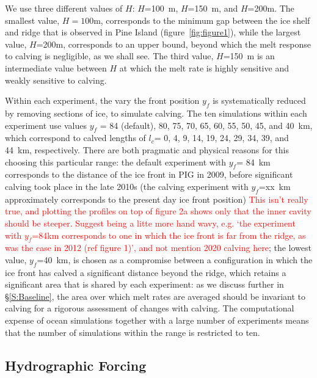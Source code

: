 \documentclass[draft]{agujournal2019}
\newcommand{\red}[1]{\textcolor{red}{#1}}
\begin{document}
We use three different values of $H$: $H$=100~m, $H$=150~m, and $H$=200m. The smallest value, $H = 100$m, corresponds to the minimum gap between the ice shelf and ridge that is observed in Pine Island (figure~\ref{fig:figure1}), while the largest value, $H$=200m, corresponds to an upper bound, beyond which the melt response to calving is negligible, as we shall see. The third value, $H$=150~m is an intermediate value between $H$ at which the melt rate is highly sensitive and weakly sensitive to calving.

Within each experiment, the vary the front position $y_f$ is systematically reduced by removing sections of ice, to simulate calving. The ten simulations within each experiment use values $y_f$ = 84 (default), 80, 75, 70, 65, 60, 55, 50, 45, and 40~km, which correspond to calved lengths of $l_c$= 0, 4, 9, 14, 19, 24, 29, 34, 39, and 44~km, respectively. There are both pragmatic and physical reasons for this choosing this particular range: the default experiment with $y_f$= 84~km corresponds to the distance of the ice front in PIG in 2009, before significant calving took place in the late 2010s (the calving experiment with $y_f$=xx~km approximately corresponds to the present day ice front position) \red{This isn't really true, and plotting the profiles on top of figure 2a shows only that the inner cavity should be steeper. Suggest being a litte more hand wavy, e.g. `the experiment with $y_f$=84km corresponds to one in which the ice front is far from the ridge, as was the case in 2012 (ref figure 1)', and not mention 2020 calving here}; the lowest value, $y_f$=40~km, is chosen as a compromise between a configuration in which the ice front has calved a significant distance beyond the ridge, which retains a significant area that is shared by each experiment: as we discuss further in \S\ref{S:Baseline}, the area over which melt rates are averaged should be invariant to calving for a rigorous assessment of changes with calving. The computational expense of ocean simulations together with a large number of experiments means that the number of simulations within the range is restricted to ten.

\subsection{Hydrographic Forcing}\label{S:Experiment:Hydrography}
\end{document}
